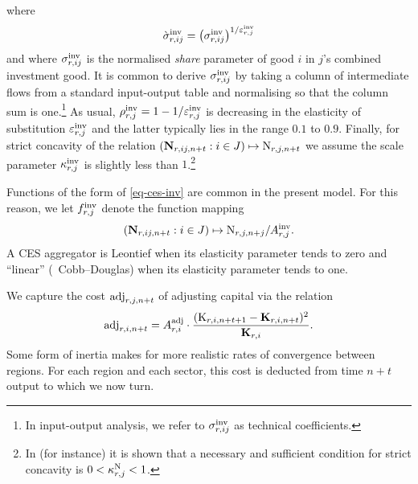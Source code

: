 \documentclass[12pt,a4paper,twoside, draft]{article}
\begin{document}
where
\[
  \grave \sigma_{r, ij}^{\textup{inv}}
  = \left( \sigma_{r, ij}^{\textup{inv}} \right)
    ^ {1 / \varepsilon_{r, j}^{\textup{inv}}}
\]
and where $\sigma_{r, ij}^{\textup{inv}}$ is the normalised \emph{share}
parameter of good $i$ in $j$'s combined investment good.
It is common to derive $\sigma_{r, ij}^{\textup{inv}}$ by taking a
column of intermediate flows from a standard input-output table and
normalising so that the column sum is one.\footnote{
  In input-output analysis, we refer to $\sigma_{r, ij}^{\textup{inv}}$ 
  as technical coefficients.
}
As usual, $\rho_{r, j}^{\textup{inv}}
  = 1 - 1 / \varepsilon_{r, j}^{\textup{inv}}$ is decreasing in the elasticity of
  substitution $\varepsilon_{r, j}^{\textup{inv}}$ and the latter typically
  lies in the range $ 0.1 $ to $0.9$.
Finally, for strict concavity of the relation
$\left(\mathbf{N}_{r, ij, n + t} : i \in J\right)
  \mapsto \textup{N}_{r, j, n + t}$ we assume the scale parameter 
$\kappa_{r, j}^\textup{inv}$ is slightly less than $1$.\footnote{
  In \citet[Theorem 2]{Kojic-Concavity} (for instance) it is shown that a
  necessary and sufficient condition for strict concavity is
  $0 < \kappa_{r, j}^\textup{N} < 1$.
}

\begin{remark}
  Functions of the form of \cref{eq-ces-inv} are common in the present
  model. 
  For this reason, we let $f_{r, j}^{\textup{inv}}$ denote the function mapping
\[
  (\mathbf{N}_{r, ij, n + t} : i \in J)
  \mapsto \textup{N}_{r, j, n + j} / A_{r, j}^{\textup{inv}}.
\]
  A CES aggregator is Leontief when its elasticity
  parameter tends to zero and ``linear'' (\ie\ Cobb--Douglas) when its
  elasticity parameter tends to one.
  
\end{remark}
We capture the cost $\textup{adj}_{r, j, n + t}$ of adjusting capital
via the relation 
\begin{equation}
  \textup{adj}_{r, i, n + t}
    = A_{r, i} ^ \textup{adj} 
      \cdot \frac{(\textup{K}_{r, i, n + t + 1}
      - \mathbf{K}_{r, i, n + t})^2}
        {\mathbf{K}_{r, i}}.
\end{equation}
Some form of inertia makes for more realistic rates of convergence between
regions.
For each region and each sector, this cost is deducted from time $n + t$ output
to which we now turn.
\end{document}
